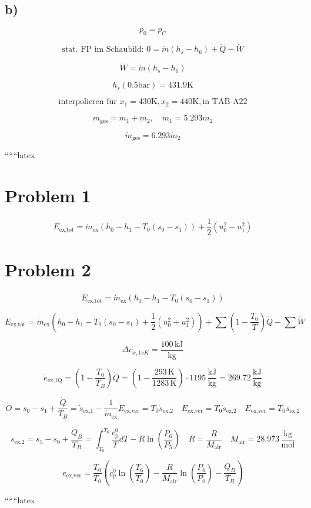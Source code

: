 

\subsection*{b)}

\[
p_0 = p_C
\]

\[
\text{stat. FP im Schaubild: } 0 = \dot{m} (h_s - h_6) + \dot{Q} - \dot{W}
\]

\[
\dot{W} = \dot{m} (h_s - h_6)
\]

\[
h_s (0.5 \text{bar}) = 431.9 \text{K}
\]

\[
\text{interpolieren für } x_1 = 430 \text{K}, x_2 = 440 \text{K}, \text{in TAB-A22}
\]

\[
\dot{m}_{\text{ges}} = \dot{m}_1 + \dot{m}_2, \quad \dot{m}_1 = 5.293 \dot{m}_2
\]

\[
\dot{m}_{\text{ges}} = 6.293 \dot{m}_2
\]

``````latex


\section*{Problem 1}

\[
\dot{E}_{\text{ex,tot}} = \dot{m}_{\text{ex}} (h_0 - h_1 - T_0 (s_0 - s_1)) + \frac{1}{2} (u_0^2 - u_1^2)
\]

\section*{Problem 2}

\[
\dot{E}_{\text{ex,tot}} = \dot{m}_{\text{ex}} (h_0 - h_1 - T_0 (s_0 - s_1))
\]

\[
E_{\text{ex,tot}} = \dot{m}_{\text{ex}} (h_0 - h_1 - T_0 (s_0 - s_1) + \frac{1}{2} (u_0^2 + u_1^2)) + \sum (1 - \frac{T_0}{T}) \dot{Q} - \sum \dot{W}
\]

\[
\Delta c_{x,1sK} = \frac{100 \, \text{kJ}}{\text{kg}}
\]

\[
\dot{e}_{\text{ex,1Q}} = (1 - \frac{T_0}{T_B}) \dot{Q} = (1 - \frac{293 \, \text{K}}{1283 \, \text{K}}) \cdot 1195 \, \frac{\text{kJ}}{\text{kg}} = 269.72 \, \frac{\text{kJ}}{\text{kg}}
\]

\[
O = s_0 - s_1 + \frac{\dot{Q}}{T_B} = \dot{s}_{\text{ex,1}} - \frac{1}{\dot{m}_{\text{ex}}} \dot{E}_{\text{ex,ver}} = T_0 \dot{s}_{\text{ex,2}} \quad \dot{E}_{\text{ex,ver}} = T_0 \dot{s}_{\text{ex,2}} \quad \dot{E}_{\text{ex,ver}} = T_0 \dot{s}_{\text{ex,2}}
\]

\[
\dot{s}_{\text{ex,2}} = s_5 - s_0 + \frac{\dot{Q}_B}{T_B} = \int_{T_0}^{T_6} \frac{c_p^0}{T} dT - R \ln \left( \frac{P_6}{P_5} \right) \quad R = \frac{R}{M_{\text{air}}} \quad M_{\text{air}} = 28.973 \, \frac{\text{kg}}{\text{mol}}
\]

\[
e_{\text{ex,ver}} = \frac{T_0}{T_0} (c_p^0 \ln \left( \frac{T_6}{T_0} \right) - \frac{R}{M_{\text{air}}} \ln \left( \frac{P_6}{P_0} \right) - \frac{\dot{Q}_B}{T_B})
\]

``````latex